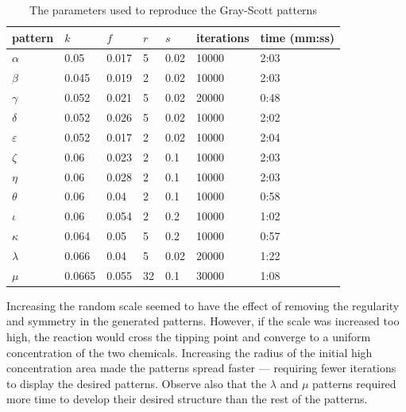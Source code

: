 \begin{table}[H]
    \centering
    \caption{The parameters used to reproduce the Gray-Scott patterns}\label{prob5:tab:parameters}
    \begin{tabular}{@{}lllllll@{}}
        \toprule
        pattern       & $k$    & $f$   & $r$ & $s$  & iterations & time (mm:ss) \\ \midrule
        $\alpha$      & 0.05   & 0.017 & 5   & 0.02 & 10000      & 2:03         \\
        $\beta$       & 0.045  & 0.019 & 2   & 0.02 & 10000      & 2:03         \\
        $\gamma$      & 0.052  & 0.021 & 5   & 0.02 & 20000      & 0:48         \\
        $\delta$      & 0.052  & 0.026 & 5   & 0.02 & 10000      & 2:02         \\
        $\varepsilon$ & 0.052  & 0.017 & 2   & 0.02 & 10000      & 2:04         \\
        $\zeta$       & 0.06   & 0.023 & 2   & 0.1  & 10000      & 2:03         \\
        $\eta$        & 0.06   & 0.028 & 2   & 0.1  & 10000      & 2:03         \\
        $\theta$      & 0.06   & 0.04  & 2   & 0.1  & 10000      & 0:58         \\
        $\iota$       & 0.06   & 0.054 & 2   & 0.2  & 10000      & 1:02         \\
        $\kappa$      & 0.064  & 0.05  & 5   & 0.2  & 10000      & 0:57         \\
        $\lambda$     & 0.066  & 0.04  & 5   & 0.02 & 20000      & 1:22         \\
        $\mu$         & 0.0665 & 0.055 & 32  & 0.1  & 30000      & 1:08         \\ \bottomrule
    \end{tabular}
\end{table}

Increasing the random scale seemed to have the effect of removing the regularity and symmetry in the generated patterns.
However, if the scale was increased too high, the reaction would cross the tipping point and converge to a uniform concentration of the two chemicals.
Increasing the radius of the initial high concentration area made the patterns spread faster --- requiring fewer iterations to display the desired patterns.
Observe also that the $\lambda$ and $\mu$ patterns required more time to develop their desired structure than the rest of the patterns.

